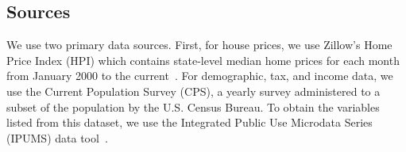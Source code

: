 \documentclass[11pt]{amsart}
\begin{document}

\subsection{Sources}
We use two primary data sources.
First, for house prices, we use Zillow's Home Price Index (HPI) which contains state-level median home prices for each month from January 2000 to the current~\cite{zillow}.
For demographic, tax, and income data, we use the Current Population Survey (CPS), a yearly survey administered to a subset of the population by the U.S. Census Bureau.
To obtain the variables listed from this dataset, we use the Integrated Public Use Microdata Series (IPUMS) data tool~\cite{IPUMS_CPS_2024}.
\end{document}
